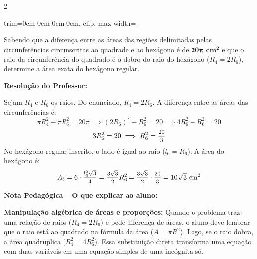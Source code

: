\begin{multicols*}{2}
\begin{center}
\begin{adjustbox}{trim=0cm 0cm 0cm 0cm, clip, max width=\larguraTikz}
\end{adjustbox}
\end{center}

Sabendo que a diferença entre as áreas das regiões delimitadas pelas circunferências circunscritas ao quadrado e ao hexágono é de $\mathbf{20\pi\text{ cm}^2}$ e que o raio da circunferência do quadrado é o dobro do raio do hexágono ($R_4 = 2R_6$), determine a área exata do hexágono regular.

\ifgabarito
    \begin{tcolorbox}[colback=CorTitUm!5, colframe=CorTitUm, boxrule=1pt, arc=4pt, left=6pt, right=6pt, top=6pt, bottom=6pt]
    \small\textbf{\textcolor{CorTitUm}{Resolução do Professor:}}\par\vspace{0.1cm}
    \color{CinzaEscuro}
    Sejam $R_4$ e $R_6$ os raios. Do enunciado, $R_4 = 2R_6$. A diferença entre as áreas das circunferências é:
    \[ \pi R_4^2 - \pi R_6^2 = 20\pi \implies (2R_6)^2 - R_6^2 = 20 \implies 4R_6^2 - R_6^2 = 20 \]
    \[ 3R_6^2 = 20 \implies R_6^2 = \mfrac{20}{3} \]
    No hexágono regular inscrito, o lado é igual ao raio ($l_6 = R_6$). A área do hexágono é:
    \[ A_6 = 6 \cdot \mfrac{l_6^2\sqrt{3}}{4} = \mfrac{3\sqrt{3}}{2} R_6^2 = \mfrac{3\sqrt{3}}{2} \cdot \mfrac{20}{3} = 10\sqrt{3} \text{ cm}^2 \]
    \end{tcolorbox}
    
    \begin{boxpedagogica}
    \textbf{\textcolor{CorVerdeBorda}{Nota Pedagógica -- O que explicar ao aluno:}}\par\vspace{0.1cm}
    \color{CinzaEscuro}
    \textbf{Manipulação algébrica de áreas e proporções:} Quando o problema traz uma relação de raios ($R_4 = 2R_6$) e pede diferença de áreas, o aluno deve lembrar que o raio está ao quadrado na fórmula da área ($A = \pi R^2$). Logo, se o raio dobra, a área quadruplica ($R_4^2 = 4R_6^2$). Essa substituição direta transforma uma equação com duas variáveis em uma equação simples de uma incógnita só.
    \end{boxpedagogica}
\fi


\end{multicols*}
